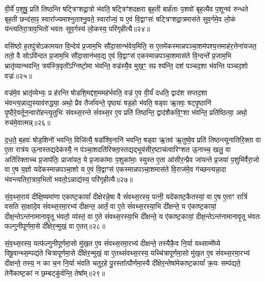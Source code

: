 वी॒र्ये॑ प॒शुषु॒ प्रति॑ तिष्ठन्ति षट्त्रिꣳशद्रा॒त्रो भ॑वति॒ षट्त्रिꣳ॑शदक्षरा बृह॒ती बार्\mbox{}ह॑ताः प॒शवो॑ बृह॒त्यैव प॒शूनव॑ रुन्धते बृह॒ती छन्द॑सा॒ꣴ॒ स्वारा᳚ज्यमाश्नुताश्नु॒वते॒ स्वारा᳚ज्यं॒ य ए॒वं वि॒द्वाꣳसः॑ षट्त्रिꣳशद्रा॒त्रमास॑ते सुव॒र्गमे॒व लो॒कं य॑न्त्यतिरा॒त्राव॒भितो॑ भवतः सुव॒र्गस्य॑ लो॒कस्य॒ परि॑गृहीत्यै॥२४॥

{\anuvakamend[{अ॒ति॒रा॒त्र ओज॑स्ये॒व षट्त्रिꣳ॑शच्च॥६॥}]}

वसि॑ष्ठो ह॒तपु॑त्रो\-ऽकामयत वि॒न्देय॑ प्र॒जाम॒भि सौ॑दा॒सान्भ॑वेय॒मिति॒ स ए॒तमे॑कस्मान्नपञ्चा॒शम॑पश्य॒त्तमाह॑र॒त्तेना॑यजत॒ ततो॒ वै सो\-ऽवि॑न्दत प्र॒जाम॒भि सौ॑दा॒सान॑भव॒द्य ए॒वं वि॒द्वाꣳस॑ एकस्मान्नपञ्चा॒शमास॑ते वि॒न्दन्ते᳚ प्र॒जाम॒भि भ्रातृ॑व्यान्भवन्ति॒ त्रय॑स्त्रि॒वृतो᳚\-ऽग्निष्टो॒मा भ॑वन्ति॒ वज्र॑स्यै॒व मुख॒ꣳ॒ सꣴ श्य॑न्ति॒ दश॑ पञ्चद॒शा भ॑वन्ति पञ्चद॒शो वज्रः॑॥२५॥

वज्र॑मे॒व भ्रातृ॑व्येभ्यः॒ प्र ह॑रन्ति षोडशि॒मद्द॑श॒ममह॑र्भवति॒ वज्र॑ ए॒व वी॒र्यं॑ दधति॒ द्वाद॑श सप्तद॒शा भ॑वन्त्य॒न्नाद्य॒स्याव॑रुद्ध्या॒ अथो॒ प्रैव तैर्जा॑यन्ते॒ पृष्ठ्यः॑ षड॒हो भ॑वति॒ षड्वा ऋ॒तवः॒ षट्पृ॒ष्ठानि॑ पृ॒ष्ठैरे॒वर्तून॒न्वारो॑हन्त्यृ॒तुभिः॑ संवथ्स॒रन्ते सं॑वथ्स॒र ए॒व प्रति॑ तिष्ठन्ति॒ द्वाद॑शैकवि॒ꣳ॒शा भ॑वन्ति॒ प्रति॑ष्ठित्या॒ अथो॒ रुच॑मे॒वात्मन्न्॥२६॥

द॒ध॒ते॒ ब॒हवः॑ षोड॒शिनो॑ भवन्ति॒ विजि॑त्यै॒ षडा᳚श्वि॒नानि॑ भवन्ति॒ षड्वा ऋ॒तव॑ ऋ॒तुष्वे॒व प्रति॑ तिष्ठन्त्यूनातिरि॒क्ता वा ए॒ता रात्र॑य ऊ॒नास्तद्यदेक॑स्यै॒ न प॑ञ्चा॒शदति॑रिक्ता॒स्तद्यद्भूय॑सीर॒ष्टाच॑त्वारिꣳशत ऊ॒नाच्च॒ खलु॒ वा अति॑रिक्ताच्च प्र॒जाप॑तिः॒ प्राजा॑यत॒ ये प्र॒जाका॑माः प॒शुका॑माः॒ स्युस्त ए॒ता आ॑सीर॒न्प्रैव जा॑यन्ते प्र॒जया॑ प॒शुभि॑र्वैरा॒जो वा ए॒ष य॒ज्ञो यदे॑कस्मान्नपञ्चा॒शो य ए॒वं वि॒द्वाꣳस॑ एकस्मान्नपञ्चा॒शमास॑ते वि॒राज॑मे॒व ग॑च्छन्त्यन्ना॒दा भ॑वन्त्यतिरा॒त्राव॒भितो॑ भवतो॒\-ऽन्नाद्य॑स्य॒ परि॑गृहीत्यै॥२७॥

{\anuvakamend[{वज्र॑ आ॒त्मन्प्र॒जया॒ द्वाविꣳ॑शतिश्च॥७॥}]}

सं॒व॒थ्स॒राय॑ दीक्षि॒ष्यमा॑णा एकाष्ट॒कायां᳚ दीक्षेरन्ने॒षा वै सं॑वथ्स॒रस्य॒ पत्नी॒ यदे॑काष्ट॒कैतस्यां॒ वा ए॒ष ए॒ताꣳ रात्रिं॑ वसति सा॒क्षादे॒व सं॑वथ्स॒रमा॒रभ्य॑ दीक्षन्त॒ आर्तं॒ वा ए॒ते सं॑वथ्स॒रस्या॒भि दी᳚क्षन्ते॒ य ए॑काष्ट॒कायां॒ दीक्ष॒न्ते\-ऽन्त॑नामानावृ॒तू भ॑वतो॒ व्य॑स्तं॒ वा ए॒ते सं॑वथ्स॒रस्या॒भि दी᳚क्षन्ते॒ य ए॑काष्ट॒कायां॒ दीक्ष॒न्ते\-ऽन्त॑नामानावृ॒तू भ॑वतः फल्गुनीपूर्णमा॒से दी᳚क्षेर॒न्मुखं॒ वा ए॒तत्॥२८॥

सं॒व॒थ्स॒रस्य॒ यत्फ॑ल्गुनीपूर्णमा॒सो मु॑ख॒त ए॒व सं॑वथ्स॒रमा॒रभ्य॑ दीक्षन्ते॒ तस्यैकै॒व नि॒र्या यथ्साम्मे᳚घ्ये विषू॒वान्थ्स॒म्पद्य॑ते चित्रापूर्णमा॒से दी᳚क्षेर॒न्मुखं॒ वा ए॒तथ्सं॑वथ्स॒रस्य॒ यच्चि॑त्रापूर्णमा॒सो मु॑ख॒त ए॒व सं॑वथ्स॒रमा॒रभ्य॑ दीक्षन्ते॒ तस्य॒ न का च॒न नि॒र्या भ॑वति चतुर॒हे पु॒रस्ता᳚त्पौर्णमा॒स्यै दी᳚क्षेर॒न्तेषा॑मेकाष्ट॒कायां᳚ क्र॒यः सम्प॑द्यते॒ तेनै॑काष्ट॒कां न छ॒म्बट्कु॑र्वन्ति॒ तेषा᳚म्॥२९॥

